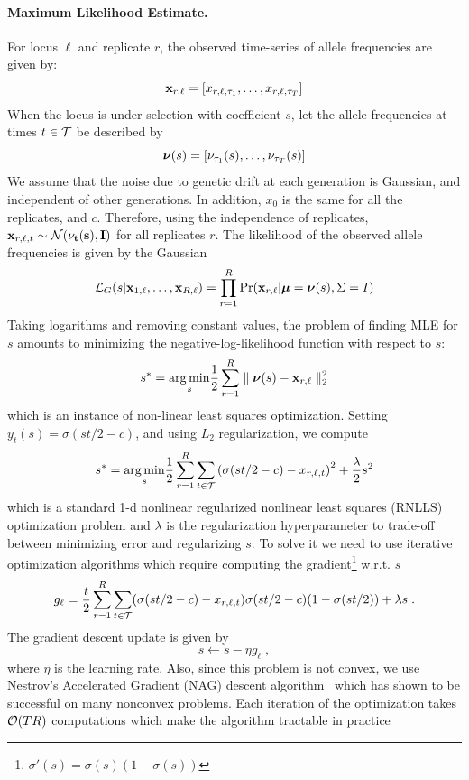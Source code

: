 \documentclass[11pt]{article}
\begin{document}
\paragraph{Maximum Likelihood Estimate.}
For locus $\ell$  and replicate $r$, the observed time-series of 
allele frequencies are given by:
\[
{{\mathbf x}_{r,\ell}} = [x_{r,\ell,\tau_1},\ldots,x_{r,\ell,\tau_T}]
\]
When the locus is under selection with coefficient $s$, let the allele
frequencies at times $t\in {\cal T}$ be described by
\[
{\boldsymbol\nu}(s) = [\nu_{\tau_1}(s),\ldots,\nu_{\tau_T}(s)]
\]
We assume that the noise due to genetic drift at each generation is
Gaussian, and independent of other generations. In addition, $x_0$ is
the same for all the replicates, and $c$. Therefore, using the
independence of replicates, ${\mathbf x}_{r,\ell,t} \sim {\cal N}(\bf\nu_t(s),I)$
for all replicates $r$. The likelihood of the observed allele
frequencies is given by the Gaussian
\begin{equation}
	{\cal L}_G(s|{\mathbf x}_{1,\ell}, \dots,{\mathbf x}_{R,\ell}) = \prod_{r=1}^R \Pr({\mathbf x}_{r,\ell}| 
	{\boldsymbol\mu}={\boldsymbol\nu}(s),
	\Sigma= I) 
\end{equation}
Taking logarithms and removing constant values, the problem of finding
MLE for $s$ amounts to minimizing the negative-log-likelihood function
with respect to $s$: 
\begin{equation}
	s^*=\underset{s}{\arg \min} \frac{1}{2} \sum_{r=1}^R \parallel 
	{{\boldsymbol\nu}(s) -
		{\mathbf x}_{r,\ell}} \parallel_2^2
	\label{eq:nlls0}
\end{equation}
which is an instance of non-linear least squares optimization.
Setting $y_t(s)=\sigma(st/2-c)$, and using $L_2$ regularization, we
compute
\begin{equation}
	s^*=\underset{s}{\arg \min} \frac{1}{2}  \sum_{r=1}^R\sum_{t\in {\cal T}} \left( 
	\sigma(st/2-c)- x_{r,\ell,t} \right)^2 + \frac{\lambda }{2}s^2
\end{equation}
which is a standard 1-d nonlinear regularized nonlinear least squares
(RNLLS) optimization problem and $\lambda$ is the regularization
hyperparameter to trade-off between minimizing error and regularizing
$s$. To solve it we need to use iterative optimization algorithms
which require computing the 
gradient\footnote{$\sigma'(s)=\sigma(s)(1-\sigma(s))$} w.r.t. $s$
\begin{equation}
	g_\ell= \frac{t}{2}  \sum_{r=1}^R \sum_{t\in {\cal T}}  ( \sigma(st/2-c)- x_{r,\ell,t} 
	) \sigma(st/2-c) (1-\sigma(st/2)) + \lambda s\; .
	\label{eq:grad}
\end{equation}
The gradient descent update is given by
\begin{equation}
	s\leftarrow s - \eta  g_\ell\;,
\end{equation}
where $\eta$ is the learning rate. Also, since this problem is not
convex, we use Nestrov's Accelerated Gradient (NAG) descent
algorithm~\cite{sutskever2013} which has shown to be successful on
many nonconvex problems. Each iteration of the optimization takes
${\cal O}(TR)$ computations which make the algorithm tractable in practice
\end{document}
